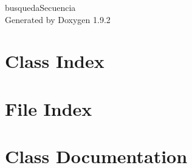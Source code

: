 \documentclass[twoside]{book}
\newcommand{\+}{\discretionary{\mbox{\scriptsize$\hookleftarrow$}}{}{}}
\newcommand{\clearemptydoublepage}{%
    \newpage{\pagestyle{empty}\cleardoublepage}%
  }
\begin{document}
  \raggedbottom
    \hypersetup{pageanchor=false,
                bookmarksnumbered=true,
                pdfencoding=unicode
               }
  \begin{titlepage}
  \vspace*{7cm}
  \begin{center}%
  {\Large busqueda\+Secuencia}\\
  \vspace*{1cm}
  {\large Generated by Doxygen 1.9.2}\\
  \end{center}
  \end{titlepage}
  \clearemptydoublepage
  \tableofcontents
  \clearemptydoublepage
  \hypersetup{pageanchor=true}
\chapter{Class Index}

\chapter{File Index}

\chapter{Class Documentation}











\end{document}
